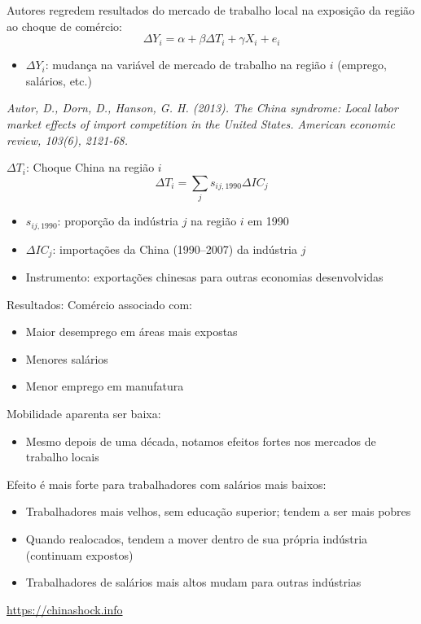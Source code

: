 \documentclass[a4paper,12pt]{article}[abntex2]
\begin{document}
Autores regredem resultados do mercado de trabalho local na exposição da região ao choque de comércio:
\[
\Delta Y_i = \alpha + \beta \Delta T_i + \gamma X_i + e_i
\]
\begin{itemize}
  \item $\Delta Y_i$: mudança na variável de mercado de trabalho na região $i$ (emprego, salários, etc.)
\end{itemize}

\textit{Autor, D., Dorn, D., Hanson, G. H. (2013). The China syndrome: Local labor market effects of import competition in the United States. American economic review, 103(6), 2121-68.}

$\Delta T_i$: Choque China na região $i$
\[
\Delta T_i = \sum_j s_{ij,1990} \Delta IC_j
\]
\begin{itemize}
  \item $s_{ij,1990}$: proporção da indústria $j$ na região $i$ em 1990
  \item $\Delta IC_j$: importações da China (1990–2007) da indústria $j$
  \item Instrumento: exportações chinesas para outras economias desenvolvidas
\end{itemize}

Resultados: Comércio associado com:
\begin{itemize}
  \item Maior desemprego em áreas mais expostas
  \item Menores salários
  \item Menor emprego em manufatura
\end{itemize}

Mobilidade aparenta ser baixa:
\begin{itemize}
  \item Mesmo depois de uma década, notamos efeitos fortes nos mercados de trabalho locais
\end{itemize}

Efeito é mais forte para trabalhadores com salários mais baixos:
\begin{itemize}
  \item Trabalhadores mais velhos, sem educação superior; tendem a ser mais pobres
  \item Quando realocados, tendem a mover dentro de sua própria indústria (continuam expostos)
  \item Trabalhadores de salários mais altos mudam para outras indústrias
\end{itemize}

\url{https://chinashock.info}
\end{document}
